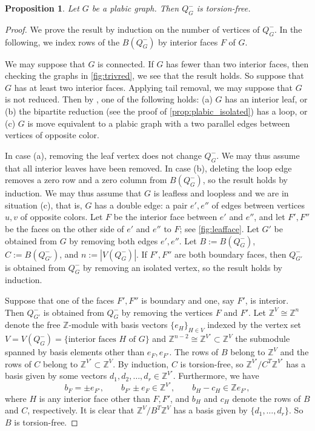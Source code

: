 \documentclass[11pt]{article}
\newtheorem{proposition}[theo]{Proposition}
\theoremstyle{definition}
\numberwithin{equation}{section}
\newcommand\Z{\mathbb{Z}}
\newcommand\red{-}
\newcommand\Qred{Q^{\red}}
\newcommand\QredG{Q^{\red}_G}
\newcommand\BQredG{B(\QredG)}
\newcommand\E{H}
\begin{document}
\begin{proposition}\label{prop:torsionfree}
Let $G$ be a plabic graph. Then $\QredG$ is torsion-free.
\end{proposition}
\begin{proof}
We prove the result by induction on the number of vertices of $\QredG$.  In the following, we index rows of the $\BQredG$ by interior faces $F$ of $G$.

We may suppose that $G$ is connected.  If $G$ has fewer than two interior faces, then checking the graphs in \cref{fig:trivred}, we see that the result holds.  So suppose that $G$ has at least two interior faces.  Applying tail removal, we may suppose that $G$ is not reduced.  Then by \cite{Pos}, one of the following holds: (a) $G$ has an interior leaf, or (b) the bipartite reduction (see the proof of \cref{prop:plabic_isolated}) has a loop, or (c) $G$ is move equivalent to a plabic graph with a two parallel edges between vertices of opposite color.

In case (a), removing the leaf vertex does not change $\QredG$.  We may thus assume that all interior leaves have been removed.  In case (b), deleting the loop edge removes a zero row and a zero column from $\BQredG$, so the result holds by induction.   We may thus assume that $G$ is leafless and loopless and we are in situation (c), that is, $G$ has a double edge: a pair $e',e''$ of edges between vertices $u,v$ of opposite colors.  Let $F$ be the interior face between $e'$ and $e''$, and let $F', F''$ be the faces on the other side of $e'$ and $e''$ to $F$; see \cref{fig:leafface}.   Let $G'$ be obtained from $G$ by removing both edges $e',e''$.  Let $B := \BQredG$, $C := B(\Qred_{G'})$, and $n := |V(\QredG)|$.  If $F',F''$ are both boundary faces, then $\Qred_{G'}$ is obtained from $\Qred_G$ by removing an isolated vertex, so the result holds by induction.  

Suppose that one of the faces $F',F''$ is boundary and one, say $F'$, is interior.    Then $\Qred_{G'}$ is obtained from $\Qred_G$ by removing the vertices $F$ and $F'$.  Let $\Z^V \cong \Z^n$ denote the free $\Z$-module with basis vectors $\{e_\E\}_{\E\in V}$ indexed by the vertex set $V = V(\Qred_G) = \{\mbox{interior faces $\E$ of $G$}\}$ and $\Z^{n-2} \cong \Z^{V'} \subset \Z^V$ the submodule spanned by basis elements other than $e_F, e_{F'}$.  The rows of $B$ belong to $\Z^V$ and the rows of $C$ belong to $\Z^{V'} \subset \Z^V$.  By induction, $C$ is torsion-free, so $\Z^{V'}/C^T \Z^{V'}$ has a basis given by some vectors $d_1,d_2,\ldots,d_r \in \Z^{V'}$.   Furthermore, we have
$$
b_F = \pm e_{F'}, \qquad b_{F'} \pm e_F \in \Z^{V'}, \qquad b_\E - c_\E \in  \Z e_{F'},  
$$
where $\E$ is any interior face other than $F,F'$, and $b_\E$ and $c_\E$ denote the rows of $B$ and $C$, respectively.  It is clear that $\Z^V/B^T \Z^V$ has a basis given by $\{d_1,\ldots,d_r\}$.  So $B$ is torsion-free.


\end{proof}
\end{document}
